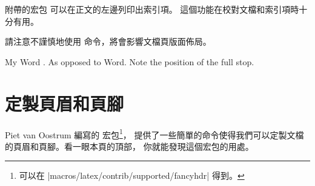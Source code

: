 
\LaTeXe{} 附帶的宏包  可以在正文的左邊列印出索引項。
這個功能在校對文檔和索引項時十分有用。



請注意不謹慎地使用  命令，將會影響文檔頁版面佈局。
\begin{example}
My Word . As opposed
to Word. Note the
position of the full stop.
\end{example}

\section{定製頁眉和頁腳}
\label{sec:fancy}


Piet van
Oostrum 編寫的  宏包\footnote{可以在 \CTANref|macros/latex/contrib/supported/fancyhdr| 得到。}，
提供了一些簡單的命令使得我們可以定製文檔的頁眉和頁腳。看一眼本頁的頂部，
你就能發現這個宏包的用處。


